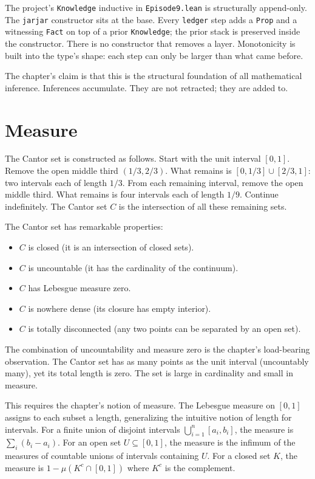 The project's \texttt{Knowledge} inductive in
\texttt{Episode9.lean} is structurally append-only. The
\texttt{jarjar} constructor sits at the base. Every
\texttt{ledger} step adds a \texttt{Prop} and a witnessing
\texttt{Fact} on top of a prior \texttt{Knowledge}; the prior
stack is preserved inside the constructor. There is no
constructor that removes a layer. Monotonicity is built into the
type's shape: each step can only be larger than what came
before.

The chapter's claim is that this is the structural foundation
of all mathematical inference. Inferences accumulate. They are
not retracted; they are added to.

\section{Measure}
\label{se:measure}

The Cantor set is constructed as follows. Start with the unit
interval $[0, 1]$. Remove the open middle third $(1/3, 2/3)$. What
remains is $[0, 1/3] \cup [2/3, 1]$: two intervals each of length
$1/3$. From each remaining interval, remove the open middle third.
What remains is four intervals each of length $1/9$. Continue
indefinitely. The Cantor set $C$ is the intersection of all these
remaining sets.

The Cantor set has remarkable properties:
\begin{itemize}
\item $C$ is closed (it is an intersection of closed sets).
\item $C$ is uncountable (it has the cardinality of the continuum).
\item $C$ has Lebesgue measure zero.
\item $C$ is nowhere dense (its closure has empty interior).
\item $C$ is totally disconnected (any two points can be separated
by an open set).
\end{itemize}

The combination of uncountability and measure zero is the chapter's
load-bearing observation. The Cantor set has as many points as
the unit interval (uncountably many), yet its total length is
zero. The set is large in cardinality and small in measure.

This requires the chapter's notion of measure. The Lebesgue measure
on $[0, 1]$ assigns to each subset a length, generalizing the
intuitive notion of length for intervals. For a finite union of
disjoint intervals $\bigcup_{i=1}^n [a_i, b_i]$, the measure is
$\sum_i (b_i - a_i)$. For an open set $U \subseteq [0, 1]$, the
measure is the infimum of the measures of countable unions of
intervals containing $U$. For a closed set $K$, the measure is
$1 - \mu(K^c \cap [0, 1])$ where $K^c$ is the complement.

